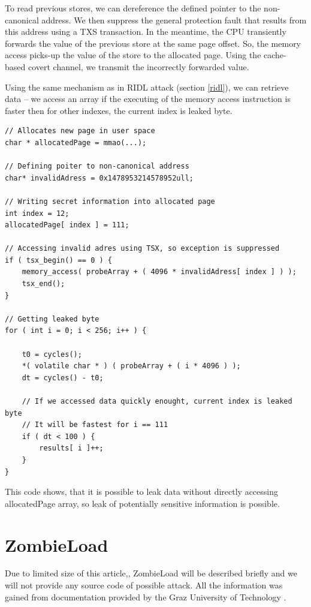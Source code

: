 \documentclass[11pt,a4paper,titlepage]{article}
\begin{document}
            To read previous stores, we can dereference the defined pointer to the non-canonical address. We then suppress the general protection fault that results from this address using a TXS transaction. In the meantime, the CPU transiently forwards the value of the previous store at the same page offset. So, the memory access picks-up the value of the store to the allocated page. Using the cache-based covert channel, we transmit the incorrectly forwarded value.
            
            Using the same mechanism as in RIDL attack (section \ref{ridl}), we can retrieve data -- we access an array if the executing of the memory access instruction is faster then for other indexes, the current index is leaked byte.
            
\begin{lstlisting}[style=CStyle]
// Allocates new page in user space
char * allocatedPage = mmao(...);

// Defining poiter to non-canonical address
char* invalidAdress = 0x1478953214578952ull;

// Writing secret information into allocated page 
int index = 12;
allocatedPage[ index ] = 111;

// Accessing invalid adres using TSX, so exception is suppressed
if ( tsx_begin() == 0 ) {
    memory_access( probeArray + ( 4096 * invalidAdress[ index ] ) );
    tsx_end();
}

// Getting leaked byte
for ( int i = 0; i < 256; i++ ) {
    
    t0 = cycles();
    *( volatile char * ) ( probeArray + ( i * 4096 ) );
    dt = cycles() - t0;
    
    // If we accessed data quickly enought, current index is leaked byte
    // It will be fastest for i == 111
    if ( dt < 100 ) {
        results[ i ]++;
    }
}    
\end{lstlisting}

            This code shows, that it is possible to leak data without directly accessing allocatedPage array, so leak of potentially sensitive information is possible.

    \section{ZombieLoad} \label{zombieload}
        Due to limited size of this article,, ZombieLoad will be described briefly and we will not provide any source code of possible attack. All the information was gained from documentation provided by the Graz University of Technology \cite{web:zombieloaddocumentation}.
        
\end{document}
